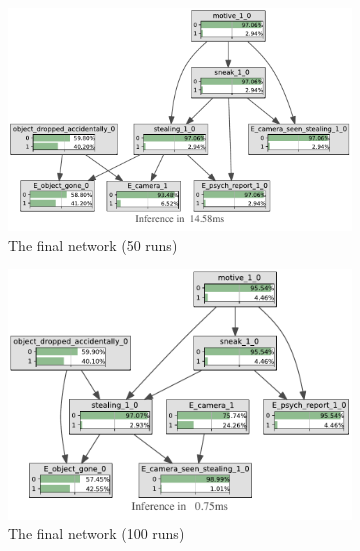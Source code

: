 \documentclass[12pt]{article}
\begin{document}
\begin{figure}[htbp]
\begin{center}
\begin{subfigure}{0.45\textwidth}
\includegraphics[width=\linewidth]{GroteMarktPrivate/bnImage/BNIMAGEGroteMarktPrivate50.pdf}
\caption{The final network (50 runs)}
\end{subfigure}
\begin{subfigure}{0.45\textwidth}
\includegraphics[width=\linewidth]{GroteMarktPrivate/bnImage/BNIMAGEGroteMarktPrivate100.pdf}
\caption{The final network (100 runs)}
\end{subfigure}
\begin{subfigure}{0.45\textwidth}

\end{subfigure}
\end{center}
\end{figure}
\end{document}
